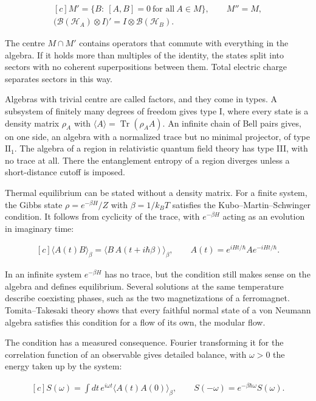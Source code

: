 \documentclass[11pt,oneside]{book}
\newenvironment{centeredalign}{\[\begin{gathered}[c]}{\end{gathered}\]}
\begin{document}
\begin{centeredalign}
M'=\{B:\ [A,B]=0\ \text{for all}\ A\in M\},\qquad M''=M,\\
\bigl(\mathcal B(\mathcal H_A)\otimes I\bigr)'=I\otimes\mathcal B(\mathcal H_B).
\end{centeredalign}

The centre \(M\cap M'\) contains operators that commute with everything in the algebra. If it holds more than multiples of the identity, the states split into sectors with no coherent superpositions between them. Total electric charge separates sectors in this way.

Algebras with trivial centre are called factors, and they come in types. A subsystem of finitely many degrees of freedom gives type I, where every state is a density matrix \(\rho_A\) with \(\langle A\rangle=\operatorname{Tr}(\rho_AA)\). An infinite chain of Bell pairs gives, on one side, an algebra with a normalized trace but no minimal projector, of type \(\mathrm{II}_1\). The algebra of a region in relativistic quantum field theory has type III, with no trace at all. There the entanglement entropy of a region diverges unless a short-distance cutoff is imposed.

Thermal equilibrium can be stated without a density matrix. For a finite system, the Gibbs state \(\rho=e^{-\beta H}/Z\) with \(\beta=1/k_BT\) satisfies the Kubo--Martin--Schwinger condition. It follows from cyclicity of the trace, with \(e^{-\beta H}\) acting as an evolution in imaginary time:

\begin{centeredalign}
\langle A(t)B\rangle_\beta=\langle B\,A(t+i\hbar\beta)\rangle_\beta,\qquad
A(t)=e^{iHt/\hbar}Ae^{-iHt/\hbar}.
\end{centeredalign}

In an infinite system \(e^{-\beta H}\) has no trace, but the condition still makes sense on the algebra and defines equilibrium. Several solutions at the same temperature describe coexisting phases, such as the two magnetizations of a ferromagnet. Tomita--Takesaki theory shows that every faithful normal state of a von Neumann algebra satisfies this condition for a flow of its own, the modular flow.

The condition has a measured consequence. Fourier transforming it for the correlation function of an observable gives detailed balance, with \(\omega>0\) the energy taken up by the system:

\begin{centeredalign}
S(\omega)=\int dt\,e^{i\omega t}\langle A(t)A(0)\rangle_\beta,\qquad
S(-\omega)=e^{-\beta\hbar\omega}S(\omega).
\end{centeredalign}
\end{document}
